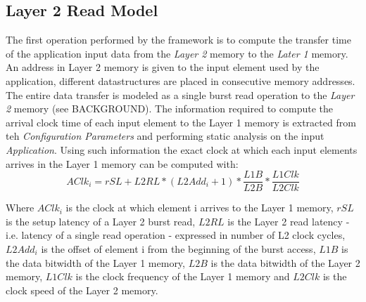 \subsection{Layer 2 Read Model}
\label{ssec:l2_read_model}
The first operation performed by the framework is to compute the transfer time of the application input data from the \textit{Layer 2} memory to the \textit{Later 1} memory. An address in Layer 2 memory is given to the input element used by the application, different datastructures are placed in consecutive memory addresses. The entire data transfer is modeled as a single burst read operation to the \textit{Layer 2} memory (see BACKGROUND). The information required to compute the arrival clock time of each input element to the Layer 1 memory is extracted from teh \textit{Configuration Parameters} and performing static analysis on the input \textit{Application}.
Using such information  the exact clock at which each input elements arrives in the Layer 1 memory can be computed with:
$$
AClk_i = rSL + L2RL * (L2Add_i+1) * \frac{L1B}{L2B} * \frac{L1Clk}{L2Clk}
$$

Where $AClk_i$ is the clock at which element i arrives to the Layer 1 memory, $rSL$ is the setup latency of a Layer 2 burst read, $L2RL$ is the Layer 2 read latency - i.e. latency of a single read operation - expressed in number of L2 clock cycles, $L2Add_i$ is the offset of element i from the beginning of the burst access, $L1B$ is the data bitwidth of the Layer 1 memory, $L2B$ is the data bitwidth of the Layer 2 memory, $L1Clk$ is the clock frequency of the Layer 1 memory and $L2Clk$ is the clock speed of the Layer 2 memory.

